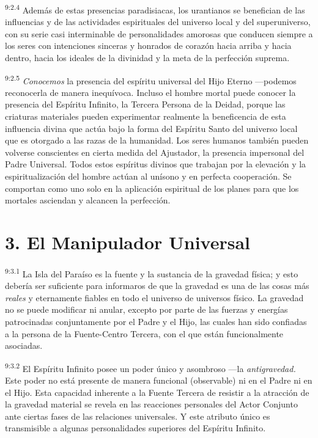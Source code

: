 \par
\textsuperscript{9:2.4} Además de estas presencias paradisiacas, los urantianos se benefician de las influencias y de las actividades espirituales del universo local y del superuniverso, con su serie casi interminable de personalidades amorosas que conducen siempre a los seres con intenciones sinceras y honrados de corazón hacia arriba y hacia dentro, hacia los ideales de la divinidad y la meta de la perfección suprema.

\par
\textsuperscript{9:2.5} \textit{Conocemos} la presencia del espíritu universal del Hijo Eterno ---podemos reconocerla de manera inequívoca. Incluso el hombre mortal puede conocer la presencia del Espíritu Infinito, la Tercera Persona de la Deidad, porque las criaturas materiales pueden experimentar realmente la beneficencia de esta influencia divina que actúa bajo la forma del Espíritu Santo del universo local que es otorgado a las razas de la humanidad. Los seres humanos también pueden volverse conscientes en cierta medida del Ajustador, la presencia impersonal del Padre Universal. Todos estos espíritus divinos que trabajan por la elevación y la espiritualización del hombre actúan al unísono y en perfecta cooperación. Se comportan como uno solo en la aplicación espiritual de los planes para que los mortales asciendan y alcancen la perfección.

\section*{3. El Manipulador Universal}
\par
\textsuperscript{9:3.1} La Isla del Paraíso es la fuente y la sustancia de la gravedad física; y esto debería ser suficiente para informaros de que la gravedad es una de las cosas más \textit{reales} y eternamente fiables en todo el universo de universos físico. La gravedad no se puede modificar ni anular, excepto por parte de las fuerzas y energías patrocinadas conjuntamente por el Padre y el Hijo, las cuales han sido confiadas a la persona de la Fuente-Centro Tercera, con el que están funcionalmente asociadas.

\par
\textsuperscript{9:3.2} El Espíritu Infinito posee un poder único y asombroso ---la \textit{antigravedad.} Este poder no está presente de manera funcional (observable) ni en el Padre ni en el Hijo. Esta capacidad inherente a la Fuente Tercera de resistir a la atracción de la gravedad material se revela en las reacciones personales del Actor Conjunto ante ciertas fases de las relaciones universales. Y este atributo único es transmisible a algunas personalidades superiores del Espíritu Infinito.


